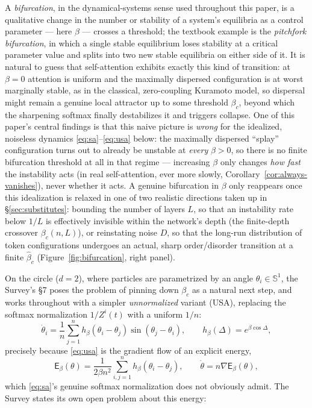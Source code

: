 \documentclass[11pt]{article}
\begin{document}
A \emph{bifurcation}, in the dynamical-systems sense used throughout this paper, is a qualitative change in the number or stability of a system's equilibria as a control parameter --- here $\beta$ --- crosses a threshold; the textbook example is the \emph{pitchfork bifurcation}, in which a single stable equilibrium loses stability at a critical parameter value and splits into two new stable equilibria on either side of it. It is natural to guess that self-attention exhibits exactly this kind of transition: at $\beta=0$ attention is uniform and the maximally dispersed configuration is at worst marginally stable, as in the classical, zero-coupling Kuramoto model, so dispersal might remain a genuine local attractor up to some threshold $\beta_c$, beyond which the sharpening softmax finally destabilizes it and triggers collapse. One of this paper's central findings is that this naive picture is \emph{wrong} for the idealized, noiseless dynamics \eqref{eq:sa}--\eqref{eq:usa} below: the maximally dispersed ``splay'' configuration turns out to already be unstable at \emph{every} $\beta>0$, so there is no finite bifurcation threshold at all in that regime --- increasing $\beta$ only changes \emph{how fast} the instability acts (in real self-attention, ever more slowly, Corollary~\ref{cor:always-vanishes}), never whether it acts. A genuine bifurcation in $\beta$ only reappears once this idealization is relaxed in one of two realistic directions taken up in \S\ref{sec:substitutes}: bounding the number of layers $L$, so that an instability rate below $1/L$ is effectively invisible within the network's depth (the finite-depth crossover $\beta_c(n,L)$), or reinstating noise $D$, so that the long-run distribution of token configurations undergoes an actual, sharp order/disorder transition at a finite $\hat\beta_c$ (Figure~\ref{fig:bifurcation}, right panel).

On the circle ($d=2$), where particles are parametrized by an angle $\theta_i\in\mathbb{S}^1$, the Survey's \S 7 poses the problem of pinning down $\beta_c$ as a natural next step, and works throughout with a simpler \emph{unnormalized} variant (USA), replacing the softmax normalization $1/Z^i(t)$ with a uniform $1/n$:
\begin{equation}
    \dot\theta_i = \frac{1}{n}\sum_{j=1}^n h_\beta(\theta_i-\theta_j)\sin(\theta_j-\theta_i), \qquad h_\beta(\Delta) = e^{\beta\cos\Delta},
    \label{eq:usa}
\end{equation}
precisely because \eqref{eq:usa} is the gradient flow of an explicit energy,
\begin{equation}
    \mathsf{E}_\beta(\theta) = \frac{1}{2\beta n^2}\sum_{i,j=1}^n h_\beta(\theta_i-\theta_j), \qquad \dot\theta = n\nabla\mathsf{E}_\beta(\theta),
    \label{eq:energy}
\end{equation}
which \eqref{eq:sa}'s genuine softmax normalization does not obviously admit. The Survey states its own open problem about this energy:
\end{document}
